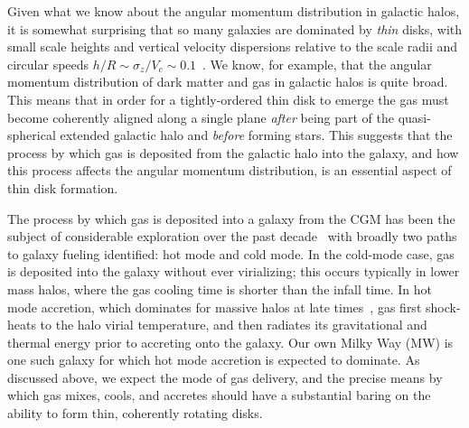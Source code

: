 \documentclass[fleqn,usenatbib]{mnras}
\begin{document}
Given what we know about the angular momentum distribution in galactic halos, it is somewhat surprising that so many galaxies are dominated by {\em thin} disks, with small scale heights and vertical velocity dispersions relative to the scale radii and circular speeds $h/R \sim \sigma_z/V_c \sim 0.1$~\citep[][]{Kregel2002, Kregel2002}.
We know, for example, that the angular momentum distribution of dark matter \citep{B01} and gas \citep{Stewart2013,DeFelippis2020} in galactic halos is quite broad.
This means that in order for a tightly-ordered thin disk to emerge the gas must become coherently aligned along a single plane \textit{after} being part of the quasi-spherical extended galactic halo and \textit{before} forming stars.
This suggests that the process by which gas is deposited from the galactic halo into the galaxy, and how this process affects the angular momentum distribution, is an essential aspect of thin disk formation.
 
The process by which gas is deposited into a galaxy from the CGM has been the subject of considerable exploration over the past decade~\citep[e.g.][]{Keres2005, Dekel2006, Keres2009, Angles-Alcazar2017, Martin2019a} with broadly two paths to galaxy fueling identified: hot mode and cold mode.
In the cold-mode case, gas is deposited into the galaxy without ever virializing; this occurs typically in lower mass halos, where the gas cooling time is shorter than the infall time.
In hot mode accretion, which dominates for massive halos at late times~\citep[e.g.][]{VandeVoort2011, VandeVoort2012a, Joung2012, Murante2012, Nelson2013}, gas first shock-heats to the halo virial temperature, and then radiates its gravitational and thermal energy prior to accreting onto the galaxy.
Our own Milky Way (MW) is one such galaxy for which hot mode accretion is expected to dominate.
As discussed above, we expect the mode of gas delivery, and the precise means by which gas mixes, cools, and accretes should have a substantial baring on the ability to form thin, coherently rotating disks.  
\end{document}
